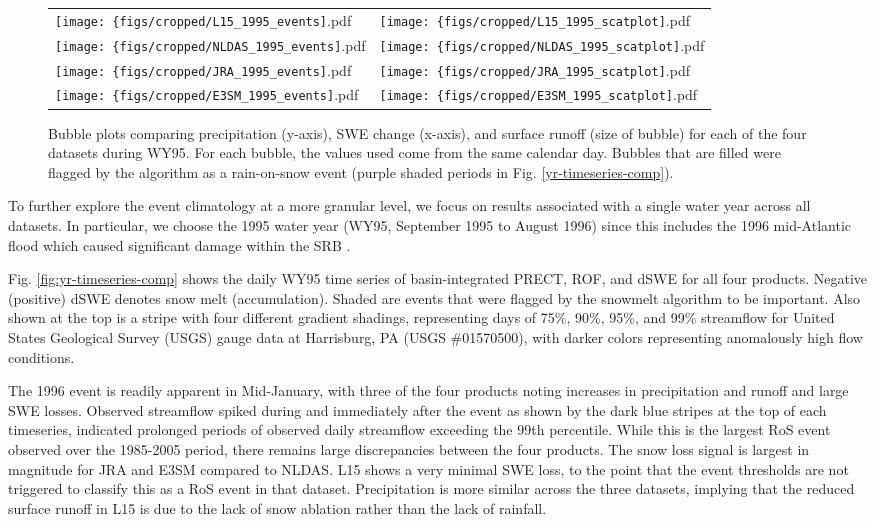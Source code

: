 \documentclass[draft]{agujournal2019}
\begin{document}
\begin{figure}
\begin{tabularx}{\textwidth}{XX}
\texttt{[image: \{figs/cropped/L15\_1995\_events]}.pdf} & \texttt{[image: \{figs/cropped/L15\_1995\_scatplot]}.pdf} \\ \texttt{[image: \{figs/cropped/NLDAS\_1995\_events]}.pdf} & \texttt{[image: \{figs/cropped/NLDAS\_1995\_scatplot]}.pdf} \\
    \texttt{[image: \{figs/cropped/JRA\_1995\_events]}.pdf} & \texttt{[image: \{figs/cropped/JRA\_1995\_scatplot]}.pdf} \\\texttt{[image: \{figs/cropped/E3SM\_1995\_events]}.pdf} & \texttt{[image: \{figs/cropped/E3SM\_1995\_scatplot]}.pdf}
\end{tabularx}
\caption{Bubble plots comparing precipitation (y-axis), SWE change (x-axis), and surface runoff (size of bubble) for each of the four datasets during WY95. For each bubble, the values used come from the same calendar day. Bubbles that are filled were flagged by the algorithm as a rain-on-snow event (purple shaded periods in Fig. \ref{yr-timeseries-comp}).}
\label{fig:merged-wy}
\end{figure}

To further explore the event climatology at a more granular level, we focus on results associated with a single water year across all datasets. In particular, we choose the 1995 water year (WY95, September 1995 to August 1996) since this includes the 1996 mid-Atlantic flood which caused significant damage within the SRB \citep{leathers1998severe}.

Fig. \ref{fig:yr-timeseries-comp} shows the daily WY95 time series of basin-integrated PRECT, ROF, and dSWE for all four products. Negative (positive) dSWE denotes snow melt (accumulation). Shaded are events that were flagged by the snowmelt algorithm to be important. Also shown at the top is a stripe with four different gradient shadings, representing days of 75\%, 90\%, 95\%, and 99\% streamflow for United States Geological Survey (USGS) gauge data at Harrisburg, PA (USGS \#01570500), with darker colors representing anomalously high flow conditions.

The 1996 event is readily apparent in Mid-January, with three of the four products noting increases in precipitation and runoff and large SWE losses. Observed streamflow spiked during and immediately after the event as shown by the dark blue stripes at the top of each timeseries, indicated prolonged periods of observed daily streamflow exceeding the 99th percentile. While this is the largest RoS event observed over the 1985-2005 period, there remains large discrepancies between the four products. The snow loss signal is largest in magnitude for JRA and E3SM compared to NLDAS. L15 shows a very minimal SWE loss, to the point that the event thresholds are not triggered to classify this as a RoS event in that dataset. Precipitation is more similar across the three datasets, implying that the reduced surface runoff in L15 is due to the lack of snow ablation rather than the lack of rainfall.
\end{document}
